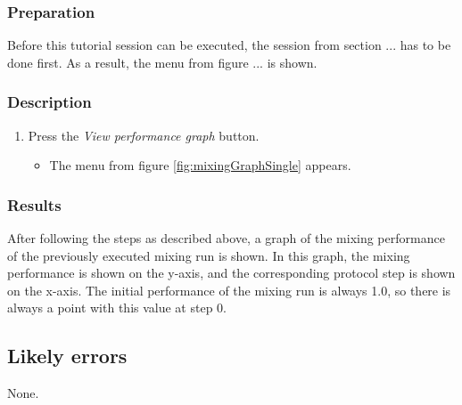 \subsubsection{Preparation}
Before this tutorial session can be executed, the session from section ... has to be done first. As a result, the menu from figure ... is shown.

\subsubsection{Description}\label{subsubsec:viewsinglegraphDesc}
\begin{enumerate}
	\item Press the \emph{View performance graph} button.
		\begin{itemize}
			\item The menu from figure \ref{fig:mixingGraphSingle} appears.
		\end{itemize}	
\end{enumerate}


\subsubsection{Results}
After following the steps as described above, a graph of the mixing performance of the previously executed mixing run is shown. In this graph, the mixing performance is shown on the y-axis, and the corresponding protocol step is shown on the x-axis. The initial performance of the mixing run is always 1.0, so there is always a point with this value at step 0.

\subsection{Likely errors}
None.